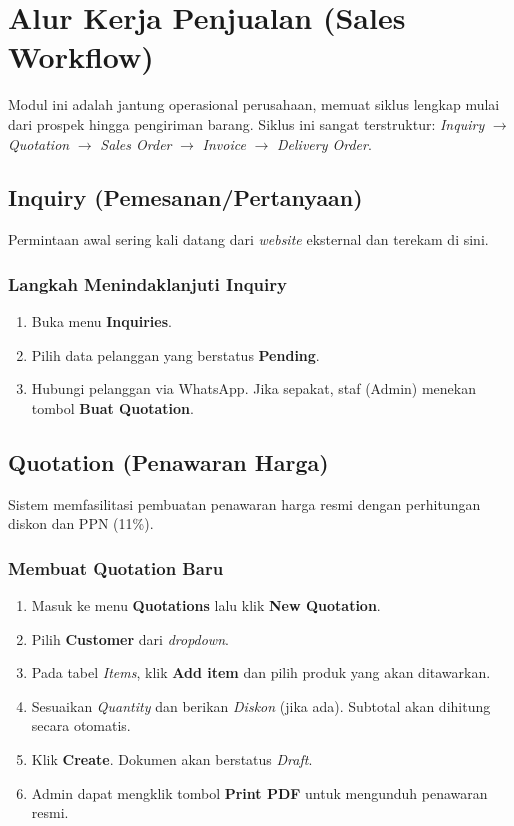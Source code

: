 \chapter{Alur Kerja Penjualan (Sales Workflow)}

Modul ini adalah jantung operasional perusahaan, memuat siklus lengkap mulai dari prospek hingga pengiriman barang. Siklus ini sangat terstruktur: \textit{Inquiry} $\rightarrow$ \textit{Quotation} $\rightarrow$ \textit{Sales Order} $\rightarrow$ \textit{Invoice} $\rightarrow$ \textit{Delivery Order}.

\section{Inquiry (Pemesanan/Pertanyaan)}
Permintaan awal sering kali datang dari \textit{website} eksternal dan terekam di sini.

\subsection{Langkah Menindaklanjuti Inquiry}
\begin{enumerate}
    \item Buka menu \textbf{Inquiries}.
    \item Pilih data pelanggan yang berstatus \textbf{Pending}.
    \item Hubungi pelanggan via WhatsApp. Jika sepakat, staf (Admin) menekan tombol \textbf{Buat Quotation}.
\end{enumerate}

\section{Quotation (Penawaran Harga)}
Sistem memfasilitasi pembuatan penawaran harga resmi dengan perhitungan diskon dan PPN (11\%).

\subsection{Membuat Quotation Baru}
\begin{enumerate}
    \item Masuk ke menu \textbf{Quotations} lalu klik \textbf{New Quotation}.
    \item Pilih \textbf{Customer} dari \textit{dropdown}.
    \item Pada tabel \textit{Items}, klik \textbf{Add item} dan pilih produk yang akan ditawarkan.
    \item Sesuaikan \textit{Quantity} dan berikan \textit{Diskon} (jika ada). Subtotal akan dihitung secara otomatis.
    \item Klik \textbf{Create}. Dokumen akan berstatus \textit{Draft}.
    \item Admin dapat mengklik tombol \textbf{Print PDF} untuk mengunduh penawaran resmi.
\end{enumerate}

